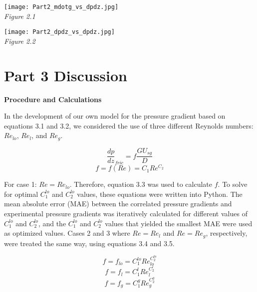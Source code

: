 \begin{center}
\texttt{[image: Part2\_mdotg\_vs\_dpdz.jpg]}\\
\textit{Figure 2.1}
\end{center}

\begin{center}
\texttt{[image: Part2\_dpdz\_vs\_dpdz.jpg]}\\
\textit{Figure 2.2}
\end{center}

\section{Part 3 Discussion}

\textbf{Procedure and Calculations}

In the development of our own model for the pressure gradient based on equations 3.1 and 3.2, we considered the use of three different Reynolds numbers: \(Re_{lo}\), \(Re_l\), and \(Re_g\). 

\begin{equation}
\frac{dp}{dz}_{fric}=f\frac{GU_{sg}}{D}
\end{equation}
\begin{equation}
f=f(Re)=C_1Re^{C_2}
\end{equation}

For case 1: \(Re=Re_{lo}\). Therefore, equation 3.3 was used to calculate \(f\). To solve for optimal \(C_1^{lo}\) and \(C_2^{lo}\) values, these equations were written into Python. The mean absolute error (MAE) between the correlated pressure gradients and experimental pressure gradients was iteratively calculated for different values of \(C_1^{lo}\) and \(C_2^{lo}\), and the \(C_1^{lo}\) and \(C_2^{lo}\) values that yielded the smallest MAE were used as optimized values. Cases 2 and 3 where \(Re=Re_l\) and \(Re=Re_g\), respectively, were treated the same way, using equations 3.4 and 3.5.

\begin{equation}
f=f_{lo} = C_1^{lo}Re_{lo}^{C_2^{lo}}
\end{equation}
\begin{equation}
f=f_l = C_1^lRe_l^{C_2^l}
\end{equation}
\begin{equation}
f=f_g = C_1^gRe_g^{C_2^g}
\end{equation}

